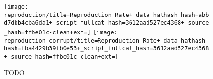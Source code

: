 \begin{figure*}[!htbp]
\begin{center}
\texttt{[image: reproduction/title=Reproduction\_Rate+\_data\_hathash\_hash=abbd7dbb4cba6da1+\_script\_fullcat\_hash=3612aad527ec4368+\_source\_hash=ffbe01c-clean+ext=]}
\texttt{[image: reproduction\_corrupt/title=Reproduction\_Rate+\_data\_hathash\_hash=fba4429b39fb0e53+\_script\_fullcat\_hash=3612aad527ec4368+\_source\_hash=ffbe01c-clean+ext=]}
\caption{
TODO
}
\label{fig:reproduction}
\end{center}
\end{figure*}
